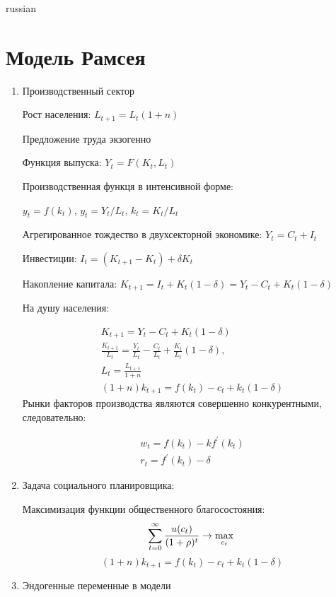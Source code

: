 \documentclass{article}
\begin{document}
\begin{otherlanguage*}{russian}
\section{\foreignlanguage{russian}{Модель Рамсея}}
\begin{enumerate}
\item Производственный сектор

Рост населения: $ L_{t + 1} = L_t (1 + n) $ 

Предложение труда экзогенно

Функция выпуска: $ Y_t = F(K_t, L_t) $  

Производственная функця в интенсивной форме: 

$ y_t = f(k_t)$, $ y_t = Y_t / L_t$, $ k_t = K_t / L_t$

Агрегированное тождество в двухсекторной экономике: $ Y_t = C_t + I_t $ 

Инвестиции: $I_t = (K_{t+1} - K_t) + \delta K_t $ 

Накопление капитала: $ K_{t + 1} = I_t + K_t ( 1 - \delta) = Y_t - C_t + K_t (1 - \delta) $ 

На душу населения:

\begin{align}
K_{t + 1} = Y_t - C_t + K_t (1 - \delta) \\
\frac{K_{t+1}}{L_t} = \frac{Y_t}{L_t} - \frac{C_t}{L_t} + \frac{K_t}{L_t} (1 - \delta), \\
L_t = \frac{L_{t+1}}{1 + n} \\
(1 + n ) k_{t+1} = f(k_t) - c_t + k_t (1 - \delta) 
\end{align}
Рынки факторов производства являются совершенно конкурентными, следовательно:

\begin{align}
w_t = f(k_t) - k f^{'} (k_t) \\
r_t = f^{'} (k_t) - \delta 
\end{align}

\item Задача социального планировщика:

Максимизация функции общественного благосостояния:
\begin{equation}
\sum_{t = 0}^{\infty} \frac{u(c_t)}{(1 + \rho)^t} \rightarrow \max_{c_t} \\
\end{equation}
\begin{equation}
(1 + n) k_{t+1} = f (k_t) - c_t + k_t (1 - \delta) 
\end{equation}
\item Эндогенные переменные в модели 


\end{enumerate}
\end{otherlanguage*}
\end{document}
